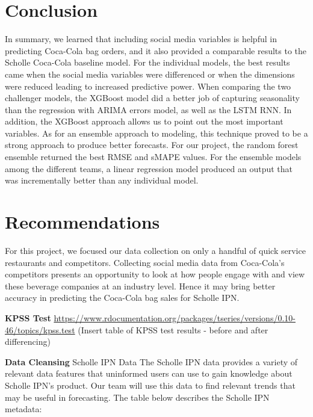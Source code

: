 \documentclass[12pt,oneside]{chicagocapstone}
\begin{document}
\chapter*{Conclusion}\label{conclusion}

In summary, we learned that including social media variables is helpful
in predicting Coca-Cola bag orders, and it also provided a comparable
results to the Scholle Coca-Cola baseline model. For the individual
models, the best results came when the social media variables were
differenced or when the dimensions were reduced leading to increased
predictive power. When comparing the two challenger models, the XGBoost
model did a better job of capturing seasonality than the regression with
ARIMA errors model, as well as the LSTM RNN. In addition, the XGBoost
approach allows us to point out the most important variables. As for an
ensemble approach to modeling, this technique proved to be a strong
approach to produce better forecasts. For our project, the random forest
ensemble returned the best RMSE and sMAPE values. For the ensemble
models among the different teams, a linear regression model produced an
output that was incrementally better than any individual model.

\chapter*{Recommendations}\label{recommendations}

For this project, we focused our data collection on only a handful of
quick service restaurants and competitors. Collecting social media data
from Coca-Cola's competitors presents an opportunity to look at how
people engage with and view these beverage companies at an industry
level. Hence it may bring better accuracy in predicting the Coca-Cola
bag sales for Scholle IPN.

\appendix

\textbf{KPSS Test}
\url{https://www.rdocumentation.org/packages/tseries/versions/0.10-46/topics/kpss.test}
(Insert table of KPSS test results - before and after differencing)

\textbf{Data Cleansing} Scholle IPN Data The Scholle IPN data provides a
variety of relevant data features that uninformed users can use to gain
knowledge about Scholle IPN's product. Our team will use this data to
find relevant trends that may be useful in forecasting. The table below
describes the Scholle IPN metadata:
\end{document}
